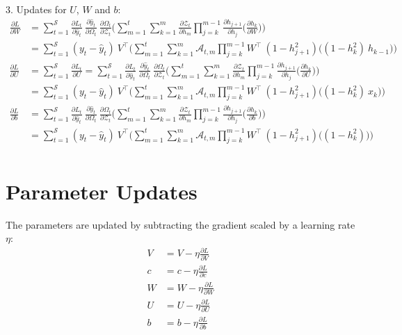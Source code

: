 \documentclass{article}
\begin{document}
3. Updates for $U$, $W$ and $b$:
\begin{align*}
   \frac{\partial L}{ \partial{W}} &=
\sum_{t=1}^{\mathcal{S}}
\frac{\partial L_t}{\partial \hat{y}_t}~\frac{\partial \hat{y}_t}{\partial \Omega_t}~\frac{\partial \Omega_t}{ \partial \mathcal{Z}_t} \biggl( 
\sum_{m=1}^{t}
\sum_{k=1}^{m} \frac{\partial \mathcal{Z}_t}{ \partial h_m} 
\prod_{j=k}^{m-1} \frac{\partial h_{j+1}}{ \partial h_j} 
\biggl( \frac{\partial h_k}{ \partial W} \biggl) \biggl) \\
  &=
\sum_{t=1}^{\mathcal{S}}
(y_t - \hat{y}_t)~V^\top \biggl( 
\sum_{m=1}^{t}
\sum_{k=1}^{m} \mathcal{A}_{t,m} 
\prod_{j=k}^{m-1} W^\top ~ (1 - h_{j+1}^2)
\biggl( (1-h_k^2)~ h_{k-1} \biggl) \biggl) \\
     \frac{\partial L}{ \partial{U}} &= \sum_{t=1}^{\mathcal{S}} \frac{\partial L_t}{ \partial{U}} =
\sum_{t=1}^{\mathcal{S}}
\frac{\partial L_t}{\partial \hat{y}_t}~\frac{\partial \hat{y}_t}{\partial \Omega_t}~\frac{\partial \Omega_t}{ \partial \mathcal{Z}_t} \biggl( 
\sum_{m=1}^{t}
\sum_{k=1}^{m} \frac{\partial \mathcal{Z}_t}{ \partial h_m} 
\prod_{j=k}^{m-1} \frac{\partial h_{j+1}}{ \partial h_j} 
\biggl( \frac{\partial h_k}{ \partial U} \biggl) \biggl) \\
  &=
\sum_{t=1}^{\mathcal{S}}
(y_t - \hat{y}_t)~V^\top \biggl( 
\sum_{m=1}^{t}
\sum_{k=1}^{m} \mathcal{A}_{t,m} 
\prod_{j=k}^{m-1} W^\top ~ (1 - h_{j+1}^2)
\biggl( (1-h_k^2)~ x_{k} \biggl) \biggl) \\
     \frac{\partial L}{ \partial{b}} &=
\sum_{t=1}^{\mathcal{S}}
\frac{\partial L_t}{\partial \hat{y}_t}~\frac{\partial \hat{y}_t}{\partial \Omega_t}~\frac{\partial \Omega_t}{ \partial \mathcal{Z}_t} \biggl( 
\sum_{m=1}^{t}
\sum_{k=1}^{m} \frac{\partial \mathcal{Z}_t}{ \partial h_m} 
\prod_{j=k}^{m-1} \frac{\partial h_{j+1}}{ \partial h_j} 
\biggl( \frac{\partial h_k}{ \partial b} \biggl) \biggl) \\
  &= 
\sum_{t=1}^{\mathcal{S}}
(y_t - \hat{y}_t)~V^\top \biggl( 
\sum_{m=1}^{t}
\sum_{k=1}^{m} \mathcal{A}_{t,m} 
\prod_{j=k}^{m-1} W^\top ~ (1 - h_{j+1}^2)
\biggl( (1-h_k^2) \biggl) \biggl) \\
\end{align*}    

\section*{Parameter Updates}

The parameters are updated by subtracting the gradient scaled by a learning rate $\eta$:
\begin{align*}
V &= V - \eta \frac{\partial L}{\partial V}\\
c &= c - \eta \frac{\partial L}{\partial c}\\
W &= W - \eta \frac{\partial L}{\partial W}\\
U &= U - \eta \frac{\partial L}{\partial U}\\
b &= b - \eta \frac{\partial L}{\partial b}
\end{align*}
\end{document}
